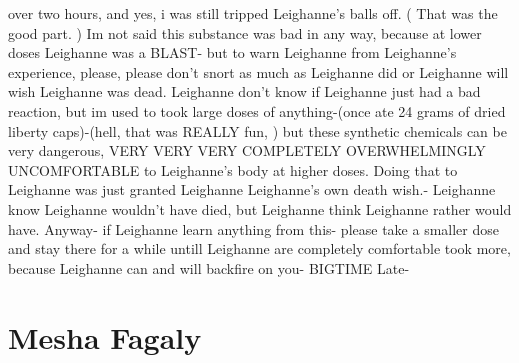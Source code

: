 \documentclass[12pt]{book}
\begin{document}
over two hours, and yes, i was still tripped Leighanne's balls off. ( That was the good part. ) Im not said this substance was bad in any way, because at lower doses Leighanne was a BLAST- but to warn Leighanne from Leighanne's experience, please, please don't snort as much as Leighanne did or Leighanne will wish Leighanne was dead. Leighanne don't know if Leighanne just had a bad reaction, but im used to took large doses of anything-(once ate 24 grams of dried liberty caps)-(hell, that was REALLY fun, ) but these synthetic chemicals can be very dangerous, VERY VERY VERY COMPLETELY OVERWHELMINGLY UNCOMFORTABLE to Leighanne's body at higher doses. Doing that to Leighanne was just granted Leighanne Leighanne's own death wish.- Leighanne know Leighanne wouldn't have died, but Leighanne think Leighanne rather would have. Anyway- if Leighanne learn anything from this- please take a smaller dose and stay there for a while untill Leighanne are completely comfortable took more, because Leighanne can and will backfire on you- BIGTIME Late-



\chapter{Mesha Fagaly}
\end{document}
